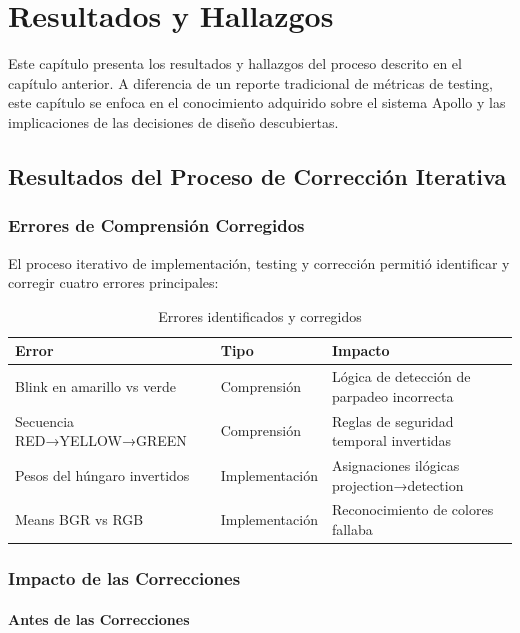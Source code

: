\chapter{Resultados y Hallazgos}
\label{cap:resultados}

Este capítulo presenta los resultados y hallazgos del proceso descrito en el capítulo anterior. A diferencia de un reporte tradicional de métricas de testing, este capítulo se enfoca en el conocimiento adquirido sobre el sistema Apollo y las implicaciones de las decisiones de diseño descubiertas.

\section{Resultados del Proceso de Corrección Iterativa}

\subsection{Errores de Comprensión Corregidos}

El proceso iterativo de implementación, testing y corrección permitió identificar y corregir cuatro errores principales:

\begin{table}[H]
\centering
\begin{tabular}{|l|l|p{5cm}|}
\hline
\textbf{Error} & \textbf{Tipo} & \textbf{Impacto} \\
\hline
Blink en amarillo vs verde & Comprensión & Lógica de detección de parpadeo incorrecta \\
\hline
Secuencia RED→YELLOW→GREEN & Comprensión & Reglas de seguridad temporal invertidas \\
\hline
Pesos del húngaro invertidos & Implementación & Asignaciones ilógicas projection→detection \\
\hline
Means BGR vs RGB & Implementación & Reconocimiento de colores fallaba \\
\hline
\end{tabular}
\caption{Errores identificados y corregidos}
\end{table}

\subsection{Impacto de las Correcciones}

\subsubsection{Antes de las Correcciones}


